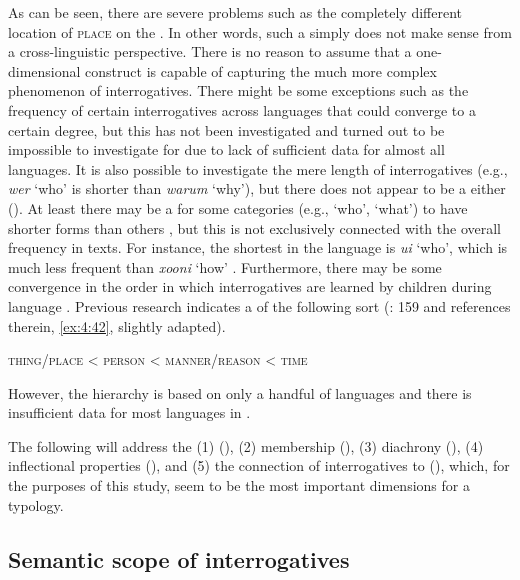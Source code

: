 \noindent As can be seen, there are severe problems such as the completely different location of \textsc{place} on the . In other words, such a  simply does not make sense from a cross-linguistic perspective. There is no reason to assume that a one-dimensional construct is capable of capturing the much more complex phenomenon of interrogatives. There might be some exceptions such as the frequency of certain interrogatives across languages that could converge to a certain degree, but this has not been investigated and turned out to be impossible to investigate for  due to lack of sufficient data for almost all languages. It is also possible to investigate the mere length of interrogatives (e.g.,  \textit{wer} ‘who’ is shorter than \textit{warum} ‘why’), but there does not appear to be a   either (\citealt{Hölzl2015c}). At least there may be a  for some categories (e.g., ‘who’, ‘what’) to have shorter forms than others \citep[1139]{Mackenzie2009}, but this is not exclusively connected with the overall frequency in texts. For instance, the shortest  in the  language  is \textit{ui} ‘who’, which is much less frequent than \textit{xooni} ‘how’ \citep[320]{Kazama2007}. Furthermore, there may be some convergence in the order in which interrogatives are learned by children during language . Previous research indicates a  of the following sort (\citealt{Tomasello2003}: 159 and references therein, \ref{ex:4:42}, slightly adapted).

\ea\upshape%
    \label{ex:4:42}
    \textsc{thing/place} < \textsc{person} < \textsc{manner/reason} < \textsc{time}
    \z

\noindent However, the hierarchy is based on only a handful of languages and there is insufficient data for most languages in .

The following will address the (1)  (), (2)  membership (), (3) diachrony (), (4) inflectional properties (), and (5) the connection of interrogatives to  (), which, for the purposes of this study, seem to be the most important dimensions for a typology.

\subsection{Semantic scope of interrogatives}\label{sec:4.3.1}

